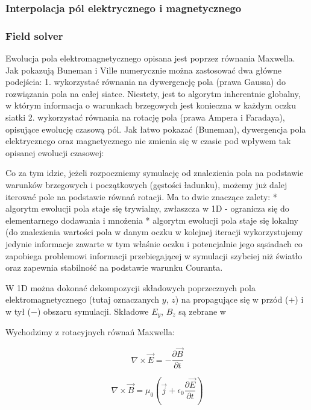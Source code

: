 \subsubsection{Interpolacja pól elektrycznego i magnetycznego}
\subsubsection{Field solver} %

Ewolucja pola elektromagnetycznego opisana jest poprzez równania Maxwella. Jak pokazują Buneman i Ville %
numerycznie można zastosować dwa główne podejścia: %
1. wykorzystać równania na dywergencję pola (prawa Gaussa) do rozwiązania pola na całej siatce. Niestety, jest to
algorytm inherentnie globalny, w którym informacja o warunkach brzegowych jest konieczna w każdym oczku siatki
2. wykorzystać równania na rotację pola (prawa Ampera i Faradaya), opisujące ewolucję czasową pól. Jak łatwo pokazać (Buneman),
dywergencja pola elektrycznego oraz magnetycznego nie zmienia się w czasie pod wpływem tak opisanej ewolucji czasowej:

Co za tym idzie, jeżeli rozpoczniemy symulację od znalezienia pola na podstawie warunków brzegowych i początkowych (gęstości
ładunku), możemy już dalej iterować pole na podstawie równań rotacji. Ma to dwie znaczące zalety:
* algorytm ewolucji pola staje się trywialny, zwłaszcza w 1D - ogranicza się do elementarnego dodawania i mnożenia %
* algorytm ewolucji pola staje się lokalny (do znalezienia wartości pola w danym oczku w kolejnej iteracji wykorzystujemy
jedynie informacje zawarte w tym właśnie oczku i potencjalnie jego sąsiadach %
co zapobiega problemowi informacji przebiegającej w symulacji szybciej niż światło oraz zapewnia stabilność na podstawie
warunku Couranta.

W 1D można dokonać dekompozycji składowych poprzecznych pola elektromagnetycznego (tutaj oznaczanych $y$, $z$) na
propagujące się w przód ($+$) i w tył ($-$) obszaru symulacji. Składowe $E_y$, $B_z$ są zebrane w %

Wychodzimy z rotacyjnych równań Maxwella:

\begin{equation}
    \nabla \times \vec{E} = -\frac{\partial \vec{B}}{\partial t}
\end{equation}

\begin{equation}
    \nabla \times \vec{B} = \mu_0 (\vec{j} + \epsilon_0 \frac{\partial \vec{E}}{\partial t})
\end{equation}

